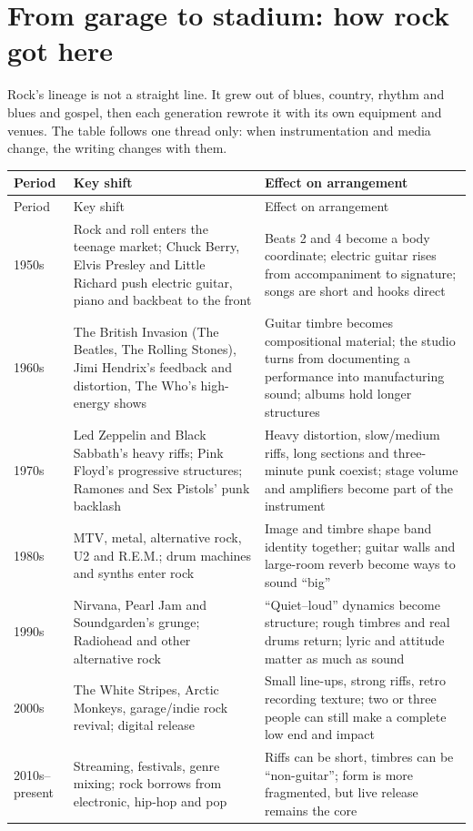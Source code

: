 \section{From garage to stadium: how rock got here}
\label{sec:rock-history}

Rock's lineage is not a straight line. It grew out of blues, country, rhythm and blues and gospel, then each generation rewrote it with its own equipment and venues. The table follows one thread only: when instrumentation and media change, the writing changes with them.

\begin{longtable}{p{}p{}p{}}
\toprule
Period & Key shift & Effect on arrangement \\
\midrule
\endfirsthead
\toprule
Period & Key shift & Effect on arrangement \\
\midrule
\endhead
1950s & Rock and roll enters the teenage market; Chuck Berry, Elvis Presley and Little Richard push electric guitar, piano and backbeat to the front & Beats 2 and 4 become a body coordinate; electric guitar rises from accompaniment to signature; songs are short and hooks direct \\
1960s & The British Invasion (The Beatles, The Rolling Stones), Jimi Hendrix's feedback and distortion, The Who's high-energy shows & Guitar timbre becomes compositional material; the studio turns from documenting a performance into manufacturing sound; albums hold longer structures \\
1970s & Led Zeppelin and Black Sabbath's heavy riffs; Pink Floyd's progressive structures; Ramones and Sex Pistols' punk backlash & Heavy distortion, slow/medium riffs, long sections and three-minute punk coexist; stage volume and amplifiers become part of the instrument \\
1980s & MTV, metal, alternative rock, U2 and R.E.M.; drum machines and synths enter rock & Image and timbre shape band identity together; guitar walls and large-room reverb become ways to sound ``big'' \\
1990s & Nirvana, Pearl Jam and Soundgarden's grunge; Radiohead and other alternative rock & ``Quiet--loud'' dynamics become structure; rough timbres and real drums return; lyric and attitude matter as much as sound \\
2000s & The White Stripes, Arctic Monkeys, garage/indie rock revival; digital release & Small line-ups, strong riffs, retro recording texture; two or three people can still make a complete low end and impact \\
2010s--present & Streaming, festivals, genre mixing; rock borrows from electronic, hip-hop and pop & Riffs can be short, timbres can be ``non-guitar''; form is more fragmented, but live release remains the core \\
\bottomrule
\end{longtable}

